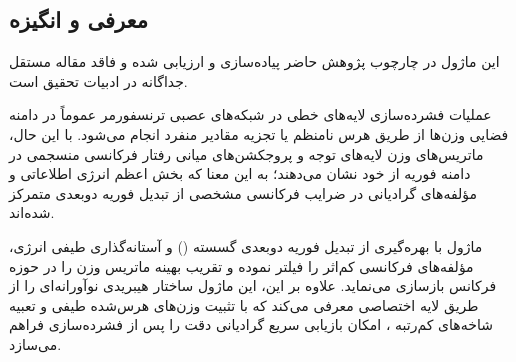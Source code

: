 \subsection{معرفی و انگیزه}
این ماژول در چارچوب پژوهش حاضر پیاده‌سازی و ارزیابی شده و فاقد مقاله مستقل جداگانه در ادبیات تحقیق است.

عملیات فشرده‌سازی لایه‌های خطی در شبکه‌های عصبی ترنسفورمر عموماً در دامنه فضایی وزن‌ها از طریق هرس نامنظم یا تجزیه مقادیر منفرد انجام می‌شود. با این حال، ماتریس‌های وزن لایه‌های توجه و پروجکشن‌های میانی رفتار فرکانسی منسجمی در دامنه فوریه از خود نشان می‌دهند؛ به این معنا که بخش اعظم انرژی اطلاعاتی و مؤلفه‌های گرادیانی در ضرایب فرکانسی مشخصی از تبدیل فوریه دو‌بعدی متمرکز شده‌اند.

ماژول  با بهره‌گیری از تبدیل فوریه دو‌بعدی گسسته () و آستانه‌گذاری طیفی انرژی، مؤلفه‌های فرکانسی کم‌اثر را فیلتر نموده و تقریب بهینه ماتریس وزن را در حوزه فرکانس بازسازی می‌نماید. علاوه بر این، این ماژول ساختار هیبریدی نوآورانه‌ای را از طریق لایه اختصاصی  معرفی می‌کند که با تثبیت وزن‌های هرس‌شده طیفی و تعبیه شاخه‌های کم‌رتبه ، امکان بازیابی سریع گرادیانی دقت را پس از فشرده‌سازی فراهم می‌سازد.
